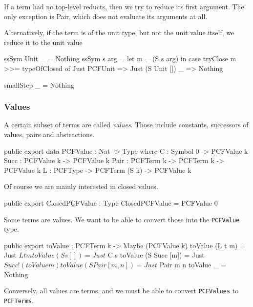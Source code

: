 If a term had no top-level reducts, then we try to reduce its first argument.
The only exception is Pair, which does not evaluate its arguments at all.


Alternatively, if the term is of the unit type, but not the unit value itself, we reduce it to the
unit value

\begin{code}
  ssSym Unit _ = Nothing
  ssSym s arg  = let m = (S s arg) in
                 case tryClose m >>= typeOfClosed of
                   Just PCFUnit => Just (S Unit [])
                   _            => Nothing

smallStep _ = Nothing
\end{code}

\subsubsection{Values}

A certain subset of terms are called \emph{values}. Those include constants,
successors of values, pairs and abstractions.

\begin{code}
public export
data PCFValue : Nat -> Type where
  C     : Symbol 0   -> PCFValue k
  Succ  : PCFValue k -> PCFValue k
  Pair  : PCFTerm k  -> PCFTerm k     -> PCFValue k
  L     : PCFType    -> PCFTerm (S k) -> PCFValue k
\end{code}

Of course we are mainly interested in closed values.

\begin{code}
public export
ClosedPCFValue : Type
ClosedPCFValue = PCFValue 0
\end{code}

Some terms are values. We want to be able to convert those into the \lstinline{PCFValue} type.

\begin{code}
public export
toValue : PCFTerm k -> Maybe (PCFValue k)
toValue (L t m)         = Just $ L t m
toValue (S s [])        = Just $ C s
toValue (S Succ [m])    = Just $ Succ !(toValue m)
toValue (S Pair [m, n]) = Just $ Pair m n
toValue _               = Nothing
\end{code}

Conversely, all values are terms, and we must be able to convert \lstinline{PCFValues}
to \lstinline{PCFTerms}.


